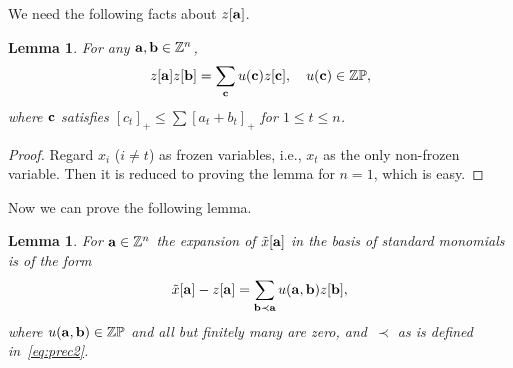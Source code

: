 \documentclass[pdftex]{sigma}
\numberwithin{equation}{section}
\newtheorem{Lemma}[Theorem]{Lemma}
\begin{document}
We need the following facts about $z[{\bf a}]$.
\begin{Lemma}\label{zproduct}
For any ${\bf a},{\bf b}\in\mathbb{Z}^n$,
\begin{gather*}
z[{\bf a}]z[{\bf b}]=\sum_{\bf c} u({\bf c})z[{\bf c}],\quad u({\bf c})\in\mathbb{ZP},
\end{gather*}
where ${\bf c}$ satisfies $[c_t]_+\le \sum[a_t+b_t]_+$ for $1\le t\le n$.
\end{Lemma}

\begin{proof}
Regard $x_i$ ($i\neq t$) as frozen variables, i.e., $x_t$ as the only non-frozen variable. Then it is reduced to proving the lemma for $n=1$, which is easy.
\end{proof}

Now we can prove the following lemma.
\begin{Lemma}\label{lem:xinz2}
For ${\bf a} \in \mathbb{Z}^n$  the expansion of $\tilde{x}[{\bf a}]$ in the basis of standard monomials is of the form
\begin{gather*}
 \tilde{x}[{\bf a}] - z[{\bf a}] = \sum_{{\bf b} \prec {\bf a}} u({\bf a},{\bf b}) z[{\bf b}],
 \end{gather*}
where $u({\bf a},{\bf b}) \in \mathbb{ZP}$ and all but finitely many are zero, and~$\prec$ as is defined in~\eqref{eq:prec2}.
\end{Lemma}
\end{document}
